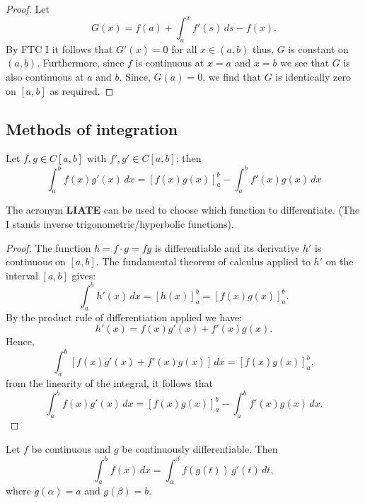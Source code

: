 \documentclass[12pt, a4paper]{article}
\begin{document}
\begin{proof}
    Let 
    \[G(x) = f(a) + \int_a^x f'(s) \, ds -f(x).\]
    By FTC I it follows that \(G'(x)=0\) for all \(x \in (a,b)\) thus, \(G\) is constant on \((a,b)\). Furthermore, since \(f\) is continuous at \(x = a\) and \(x=b\) we see that \(G\) is also continuous at \(a\) and \(b\). Since, \(G(a)=0\), we find that \(G\) is identically zero on \([a,b]\) as required.
\end{proof}

\subsection{Methods of integration}

\begin{mdthm}
    Let \(f,g \in C[a,b]\) with \(f',g' \in C[a,b]\); then
    \[\int_a^b f(x)g'(x) \, dx =[f(x)g(x)]^b_a -\int_a^b f'(x)g(x)\, dx\]
\end{mdthm}

\begin{mdnote}
    The acronym \textbf{LIATE} can be used to choose which function to differentiate. (The I stands inverse trigonometric/hyperbolic functions).
\end{mdnote}

\begin{proof}
    The function \(h =f \cdot g =fg\) is differentiable and its derivative \(h'\) is continuous on \([a,b]\). The fundamental theorem of calculus applied to \(h'\) on the interval \([a,b]\) gives:
    \[\int_a^b h'(x) \, dx =[h(x)]_a^b=[f(x)g(x)]_a^b.\]
    By the product rule of differentiation applied we have:
    \[h'(x)=f(x)g'(x)+f'(x)g(x).\]
    Hence, 
    \[\int_a^b [f(x)g'(x)+f'(x)g(x)] \, dx = [f(x)g(x)]_a^b,\]
    from the linearity of the integral, it follows that
    \[\int_a^b f(x)g'(x) \, dx =[f(x)g(x)]^b_a -\int_a^b f'(x)g(x)\, dx.\]
\end{proof}

\begin{mdthm}
    Let \(f\) be continuous and \(g\) be continuously differentiable. Then 
    \[\int_a^b f(x) \, dx = \int_{\alpha}^{\beta} f(g(t)) \, g'(t) \, dt,\]
    where \(g(\alpha)=a\) and \(g(\beta)=b\).
\end{mdthm}
\end{document}
